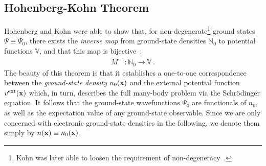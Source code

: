 \subsection{Hohenberg-Kohn Theorem}
Hohenberg and Kohn were able to show that, for non-degenerate\footnote{Kohn was later able to loosen the requirement of non-degeneracy~\cite{Kohn1985}.} ground states $\Psi \equiv \Psi_0$, there exists the \emph{inverse map} from ground-state densities $\mathbb N_0$ to potential functions $\mathbb V$, and that this map is bijective~\cite{Hohenberg1964}:
\begin{align}
	M^{-1}: \mathbb N_0 \rightarrow \mathbb V~. 
\end{align}
The beauty of this theorem is that it establishes a one-to-one correspondence between the \emph{ground-state density} $n_0 ({\bf x})$ and the external potential function $v^{\rm ext} ({\bf x})$ which, in turn, describes the full many-body problem via the Schr\"odinger equation. It follows that the ground-state wavefunctions $\Psi_0$ are functionals of $n_0$, as well as the expectation value of any ground-state observable. Since we are only concerned with electronic ground-state densities in the following, we denote them simply by $n ({\bf x}) \equiv n_0 ({\bf x})$.


